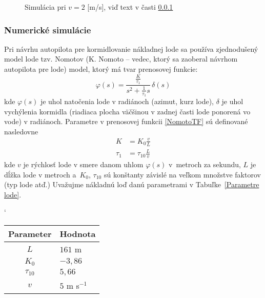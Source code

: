 \documentclass[a4paper, 10pt, ]{article}
\begin{document}
\begin{figure}[t]
	\centering



	\caption{Simulácia pri $v = 2$ [m/s], viď text v časti \ref{AS2Rpr}}
	\label{fig_tex_03_3}

\end{figure}







\subsubsection{Numerické simulácie}
\label{AS2Rpr}


Pri návrhu autopilota pre kormidlovanie nákladnej lode sa používa zjednodušený model lode tzv. Nomotov (K. Nomoto -- vedec, ktorý sa zaoberal návrhom autopilota pre lode) model, ktorý má tvar prenosovej funkcie:
\begin{equation} \label{NomotoTF}
	\varphi(s) = \frac{\frac{K}{\tau_1}}{s^2 + \frac{1}{\tau_1}s} \, \delta(s)
\end{equation}
kde $\varphi(s)$ je uhol natočenia lode v radiánoch (azimut, kurz lode), $\delta$ je uhol vychýlenia kormidla (riadiaca plocha väčšinou v zadnej časti lode ponorená vo vode) v radiánoch. Parametre v prenosovej funkcii \eqref{NomotoTF} sú definované nasledovne
\begin{align}
	K &= K_0 \frac{v}{L} \\
	\tau_1 &= \tau_{10} \frac{L}{v}
\end{align}
kde $v$ je rýchlosť lode v smere danom uhlom $\varphi(s)$ v~metroch za sekundu, $L$ je dĺžka lode v metroch a~$K_0$, $\tau_{10}$ sú konštanty závislé na veľkom množstve faktorov (typ lode atď.) Uvažujme nákladnú loď danú parametrami v Tabuľke~\ref{Parametre lode}.

\vspace{5mm}

\begin{center}
	\catcode`
	\label{Parametre lode}
	\begin{tabular}{ c l }
		\toprule
		Parameter & Hodnota \\
		\midrule
		$L$         & $161$ m \\
		$K_0$       &  $-3,86$ \\
		$\tau_{10}$ & $5,66$ \\
		$v$         &  $5$ m s$^{-1}$ \\
		\bottomrule
	\end{tabular}
\end{center}
\end{document}
